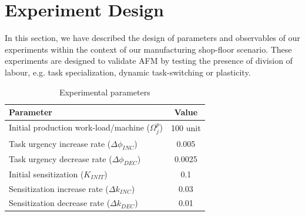 \documentclass{llncs}
\begin{document}
\section{Experiment Design}
\label{sec:expt-design}
In this section, we have described the design of parameters and observables of our experiments within the context of our manufacturing shop-floor scenario. 
These experiments are designed to validate AFM by testing the presence of division of labour, e.g. task specialization, dynamic task-switching or plasticity. 
\begin{table}
\caption{Experimental parameters}
\label{table:params}
\begin{center}
\begin{tabular}{|l||c|}
\hline Parameter & Value\\
\hline Initial production work-load/machine ($\Omega_{j}^{p}$) & 100 unit\\
\hline Task urgency increase rate ($\Delta\phi_{INC}$) & 0.005\\
\hline Task urgency decrease rate ($\Delta\phi_{DEC}$) & 0.0025\\
\hline Initial sensitization ($K_{INIT}$) & 0.1\\
\hline Sensitization increase rate ($\Delta k_{INC}$) & 0.03\\
\hline Sensitization decrease rate ($\Delta k_{DEC}$) & 0.01\\
\hline
\end{tabular}
\end{center}
\end{table}
% 
\end{document}
